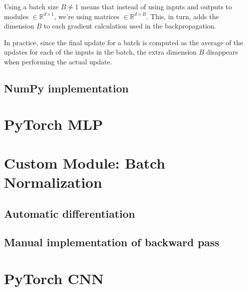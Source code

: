 \documentclass{article}
\begin{document}
\subsubsection{}

Using a batch size $B \neq 1$ means that instead of using inputs and outputs to modules $\in \mathbb{R}^{d \times 1}$, we're using matrices $\in \mathbb{R}^{d \times B}$. This, in turn, adds the dimension $B$ to each gradient calculation used in the backpropagation.

In practice, since the final update for a batch is computed as the average of the updates for each of the inputs in the batch, the extra dimension $B$ disappears when performing the actual update.

\subsection{NumPy implementation}

\section{PyTorch MLP}

\section{Custom Module: Batch Normalization}

\subsection{Automatic differentiation}

\subsection{Manual implementation of backward pass}

\subsubsection{}

\subsubsection{}

\subsubsection{}

\section{PyTorch CNN}
\end{document}
